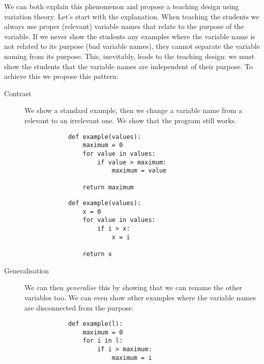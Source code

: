 We can both explain this phenomenon and propose a teaching design using 
variation theory.
Let's start with the explanation.
When teaching the students we always use proper (\ie relevant) variable 
names 
that relate to the purpose of the variable.
If we never show the students any examples where the variable name is not 
related to its purpose (bad variable names), they cannot separate the 
variable 
naming from its purpose.
This, inevitably, leads to the teaching design:
we must show the students that the variable names are independent of their 
purpose. To achieve this we propose this pattern:

\begin{description}
    \item [Contrast] We show a standard example, then we change a variable 
name from a relevant to an irrelevant one. We show that the program 
still works.
    
    \hfill
    \begin{minipage}[t]{0.45\columnwidth}
        \begin{verbatim}
            def example(values):
                maximum = 0
                for value in values:
                    if value > maximum:
                        maximum = value
    
                return maximum
        \end{verbatim}
    \end{minipage}
\hfill
    \begin{minipage}[t]{0.45\columnwidth}
        \begin{verbatim}
            def example(values):
                x = 0
                for value in values:
                    if i > x:
                        x = i
    
                return x
      \end{verbatim}
    \end{minipage}
\newline
    
    \item [Generalisation] We can then \emph{generalise} this by showing 
that we can rename the other variables too. We can even show other 
examples where the variable names are disconnected from the purpose.

    
    \hfill
    \begin{minipage}[t]{0.45\columnwidth}
        \begin{verbatim}
            def example(l):
                maximum = 0
                for i in l:
                    if i > maximum:
                        maximum = i
    

\end{verbatim}
\end{minipage}
\end{description}
